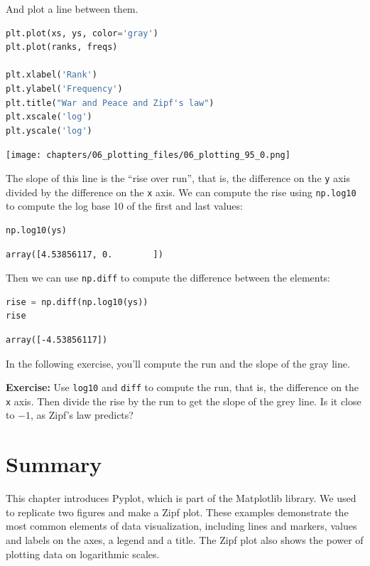 And plot a line between them.

\begin{lstlisting}[language=Python,style=source]
plt.plot(xs, ys, color='gray')
plt.plot(ranks, freqs)

plt.xlabel('Rank')
plt.ylabel('Frequency')
plt.title("War and Peace and Zipf's law")
plt.xscale('log')
plt.yscale('log')
\end{lstlisting}

\begin{center}
\texttt{[image: chapters/06\_plotting\_files/06\_plotting\_95\_0.png]}
\end{center}

The slope of this line is the ``rise over run'', that is, the difference
on the \passthrough{\lstinline!y!} axis divided by the difference on the
\passthrough{\lstinline!x!} axis. We can compute the rise using
\passthrough{\lstinline!np.log10!} to compute the log base 10 of the
first and last values:

\begin{lstlisting}[language=Python,style=source]
np.log10(ys)
\end{lstlisting}

\begin{lstlisting}[style=output]
array([4.53856117, 0.        ])
\end{lstlisting}

Then we can use \passthrough{\lstinline!np.diff!} to compute the
difference between the elements:

\begin{lstlisting}[language=Python,style=source]
rise = np.diff(np.log10(ys))
rise
\end{lstlisting}

\begin{lstlisting}[style=output]
array([-4.53856117])
\end{lstlisting}

In the following exercise, you'll compute the run and the slope of the
gray line.

\textbf{Exercise:} Use \passthrough{\lstinline!log10!} and
\passthrough{\lstinline!diff!} to compute the run, that is, the
difference on the \passthrough{\lstinline!x!} axis. Then divide the rise
by the run to get the slope of the grey line. Is it close to \(-1\), as
Zipf's law predicts?

\hypertarget{summary}{%
\section{Summary}\label{summary}}

This chapter introduces Pyplot, which is part of the Matplotlib library.
We used to replicate two figures and make a Zipf plot. These examples
demonstrate the most common elements of data visualization, including
lines and markers, values and labels on the axes, a legend and a title.
The Zipf plot also shows the power of plotting data on logarithmic
scales.

